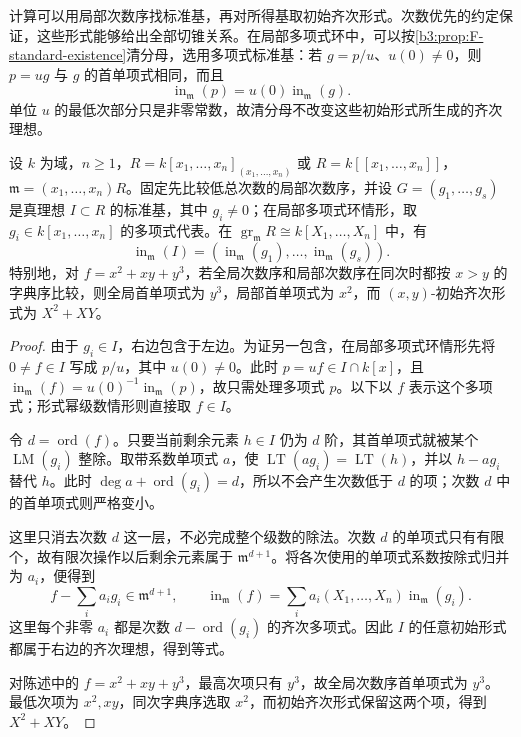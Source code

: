 计算可以用局部次数序找标准基，再对所得基取初始齐次形式。次数优先的约定保证，这些形式能够给出全部切锥关系。在局部多项式环中，可以按\cref{b3:prop:F-standard-existence}清分母，选用多项式标准基：若 \(g=p/u\)、\(u(0)\ne0\)，则 \(p=ug\) 与 \(g\) 的首单项式相同，而且
\[
	\operatorname{in}_{\mathfrak m}(p) =u(0)\operatorname{in}_{\mathfrak m}(g).
\]
单位 \(u\) 的最低次部分只是非零常数，故清分母不改变这些初始形式所生成的齐次理想。

\begin{proposition}\label{b3:prop:F-standard-basis-initial-ideal}\label{b3:prop:F-leading-versus-initial}
	设 \(k\) 为域，\(n\ge1\)，\(R=k[x_1,\ldots,x_n]_{(x_1,\ldots,x_n)}\) 或 \(R=k[\![x_1,\ldots,x_n]\!]\)，\(\mathfrak m=(x_1,\ldots,x_n)R\)。固定先比较低总次数的局部次数序，并设 \(G=(g_1,\ldots,g_s)\) 是真理想 \(I\subset R\) 的标准基，其中 \(g_i\ne0\)；在局部多项式环情形，取 \(g_i\in k[x_1,\ldots,x_n]\) 的多项式代表。在 \(\operatorname{gr}_{\mathfrak m}R\cong k[X_1,\ldots,X_n]\) 中，有
	\[
		\operatorname{in}_{\mathfrak m}(I) =(\operatorname{in}_{\mathfrak m}(g_1),\ldots, \operatorname{in}_{\mathfrak m}(g_s)).
	\]
	特别地，对 \(f=x^2+xy+y^3\)，若全局次数序和局部次数序在同次时都按 \(x>y\) 的字典序比较，则全局首单项式为 \(y^3\)，局部首单项式为 \(x^2\)，而 \((x,y)\)-初始齐次形式为 \(X^2+XY\)。
\end{proposition}
\begin{proof}
	由于 \(g_i\in I\)，右边包含于左边。为证另一包含，在局部多项式环情形先将 \(0\ne f\in I\) 写成 \(p/u\)，其中 \(u(0)\ne0\)。此时 \(p=uf\in I\cap k[x]\)，且 \(\operatorname{in}_{\mathfrak m}(f)=u(0)^{-1}\operatorname{in}_{\mathfrak m}(p)\)，故只需处理多项式 \(p\)。以下以 \(f\) 表示这个多项式；形式幂级数情形则直接取 \(f\in I\)。

	令 \(d=\operatorname{ord}(f)\)。只要当前剩余元素 \(h\in I\) 仍为 \(d\) 阶，其首单项式就被某个 \(\operatorname{LM}(g_i)\) 整除。取带系数单项式 \(a\)，使 \(\operatorname{LT}(a g_i)=\operatorname{LT}(h)\)，并以 \(h-a g_i\) 替代 \(h\)。此时 \(\deg a+\operatorname{ord}(g_i)=d\)，所以不会产生次数低于 \(d\) 的项；次数 \(d\) 中的首单项式则严格变小。

	这里只消去次数 \(d\) 这一层，不必完成整个级数的除法。次数 \(d\) 的单项式只有有限个，故有限次操作以后剩余元素属于 \(\mathfrak m^{d+1}\)。将各次使用的单项式系数按除式归并为 \(a_i\)，便得到
	\[
		f-\sum_i a_i g_i\in\mathfrak m^{d+1}, \qquad \operatorname{in}_{\mathfrak m}(f) =\sum_i a_i(X_1,\ldots,X_n) \operatorname{in}_{\mathfrak m}(g_i).
	\]
	这里每个非零 \(a_i\) 都是次数 \(d-\operatorname{ord}(g_i)\) 的齐次多项式。因此 \(I\) 的任意初始形式都属于右边的齐次理想，得到等式。

	对陈述中的 \(f=x^2+xy+y^3\)，最高次项只有 \(y^3\)，故全局次数序首单项式为 \(y^3\)。最低次项为 \(x^2,xy\)，同次字典序选取 \(x^2\)，而初始齐次形式保留这两个项，得到 \(X^2+XY\)。
\end{proof}


